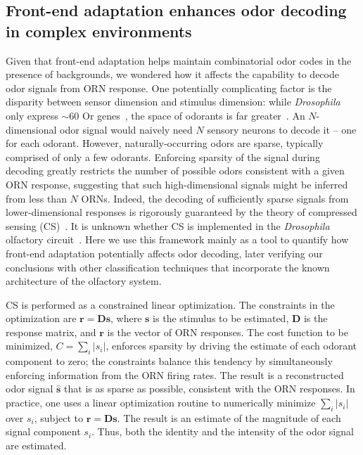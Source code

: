 \documentclass[9pt,lineno]{elife}
\begin{document}
\subsection{Front-end adaptation enhances odor decoding in complex environments}

Given that front-end adaptation helps maintain combinatorial odor codes in the presence of backgrounds, we wondered how it affects the capability to decode odor signals from ORN response. %
One potentially complicating factor is the disparity between sensor dimension and stimulus dimension: while \textit{Drosophila} only express $\sim 60$ Or genes~\citep{olfactory_sensory_map}, the space of odorants is far greater~\citep{vijay_1}. An $N$-dimensional odor signal would naively need $N$ sensory neurons to decode it -- one for each odorant. However, naturally-occurring odors are sparse, typically comprised of only a few odorants. Enforcing sparsity of the signal during decoding greatly restricts the number of possible odors consistent with a given ORN response, suggesting that such high-dimensional signals might be inferred from less than $N$ ORNs. Indeed, the decoding of sufficiently sparse signals from lower-dimensional responses is rigorously guaranteed by the theory of compressed sensing (CS)~\citep{CS_donoho, CS_tao}. It is unknown whether CS is implemented in the \textit{Drosophila} olfactory circuit~\citep{chlovskii_pevlavan}. Here we use this framework mainly as a tool to quantify how front-end adaptation potentially affects odor decoding, later verifying our conclusions with other classification techniques that incorporate the known architecture of the olfactory system. 

CS is performed as a constrained linear optimization. The constraints in the optimization are $\mathbf r = \mathbf D \mathbf s$, where $\mathbf s$ is the stimulus to be estimated, $\mathbf D$ is the response matrix, and $\mathbf r$ is the vector of ORN responses. The cost function to be minimized, $C = \sum_i |s_i|$, enforces sparsity by driving the estimate of each odorant component to zero; the constraints balance this tendency by simultaneously enforcing information from the ORN firing rates. The result is a reconstructed odor signal $\hat {\mathbf s}$ that is as sparse as possible, consistent with the ORN responses. In practice, one uses a linear optimization routine  to numerically minimize $\sum_i |s_i|$  over $s_i$, subject to $\mathbf r = \mathbf D \mathbf s$. The result is an estimate of the magnitude of each signal component $s_i$. Thus, both the identity and the intensity of the odor signal are estimated.  
\end{document}
